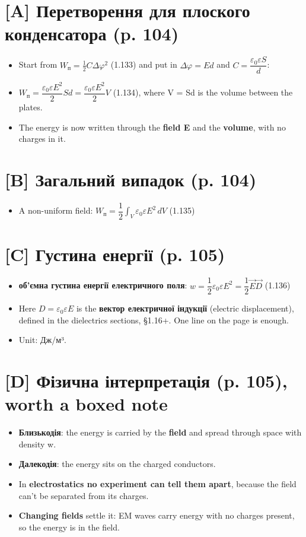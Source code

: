 \documentclass[11pt,a4paper,oneside]{book}
\begin{document}
\section*{[A] Перетворення для плоского конденсатора (p. 104)}
\begin{itemize}
\item Start from $W_\text{п} = \tfrac12 C\Delta\varphi^2$ (1.133) and put in $\Delta\varphi = Ed$ and $C = \dfrac{\varepsilon_0\varepsilon S}{d}$:
\item $W_\text{п} = \dfrac{\varepsilon_0\varepsilon E^2}{2}Sd = \dfrac{\varepsilon_0\varepsilon E^2}{2}V$ (1.134), where V = Sd is the volume between the plates.
\item The energy is now written through the \textbf{field E} and the \textbf{volume}, with no charges in it.
\end{itemize}

\section*{[B] Загальний випадок (p. 104)}
\begin{itemize}
\item A non-uniform field: $W_\text{п} = \dfrac12\int_V \varepsilon_0\varepsilon E^2\,dV$ (1.135)
\end{itemize}

\section*{[C] Густина енергії (p. 105)}
\begin{itemize}
\item \textbf{об'ємна густина енергії електричного поля}:
$w = \dfrac12\varepsilon_0\varepsilon E^2 = \dfrac12\vec E\vec D$ (1.136)
\item Here $D = \varepsilon_0\varepsilon E$ is the \textbf{вектор електричної індукції} (electric displacement), defined in the dielectrics sections, §1.16+. One line on the page is enough.
\item Unit: Дж/м³.
\end{itemize}

\section*{[D] Фізична інтерпретація (p. 105), worth a boxed note}
\begin{itemize}
\item \textbf{Близькодія}: the energy is carried by the \textbf{field} and spread through space with density w.
\item \textbf{Далекодія}: the energy sits on the charged conductors.
\item In \textbf{electrostatics no experiment can tell them apart}, because the field can't be separated from its charges.
\item \textbf{Changing fields} settle it: EM waves carry energy with no charges present, so the energy is in the field.
\end{itemize}
\end{document}
